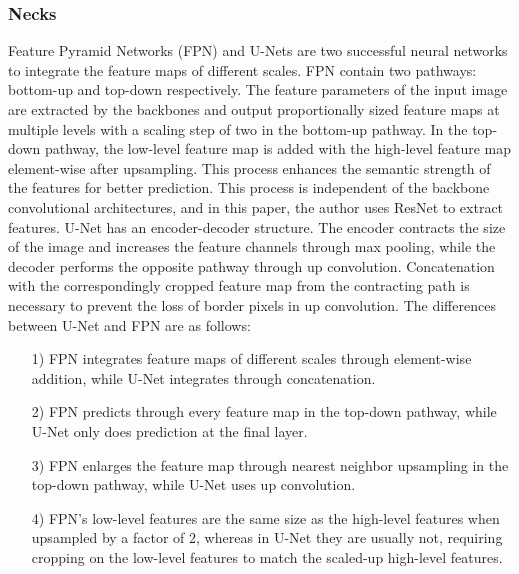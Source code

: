\subsubsection{Necks}
    Feature Pyramid Networks (FPN)\cite{8099589} and U-Nets\cite{10.1007/978-3-319-24574-4_28} are two successful neural networks to integrate the feature maps of different scales.
    FPN contain two pathways: bottom-up and top-down respectively. The feature parameters 
    of the input image are extracted by the backbones and output proportionally sized feature maps at multiple levels with a scaling step of two in the bottom-up pathway. 
    In the top-down pathway, the low-level feature map is added with the high-level feature map element-wise after upsampling. This process enhances the semantic strength 
    of the features for better prediction. This process is independent of the backbone convolutional architectures, and in this paper, the author uses ResNet to extract features.
    U-Net has an encoder-decoder structure. The encoder contracts the size of the image 
    and increases the feature channels through max pooling, while the decoder performs the opposite pathway through up convolution. Concatenation with the correspondingly 
    cropped feature map from the contracting path is necessary to prevent the loss of border pixels in up convolution. The differences between U-Net and FPN are as follows:
    \begin{itemize}
    \item [1)] FPN integrates feature maps of different scales through element-wise addition, while U-Net integrates through concatenation.      
    \item [2)] FPN predicts through every feature map in the top-down pathway, while U-Net only does prediction at the final layer.
    \item [3)] FPN enlarges the feature map through nearest neighbor upsampling in the top-down pathway, while U-Net uses up convolution. 
    \item [4)] FPN's low-level features are the same size as the high-level features when upsampled by a factor of 2, whereas in U-Net 
    they are usually not, requiring cropping on the low-level features to match the scaled-up high-level features.
    \end{itemize}
